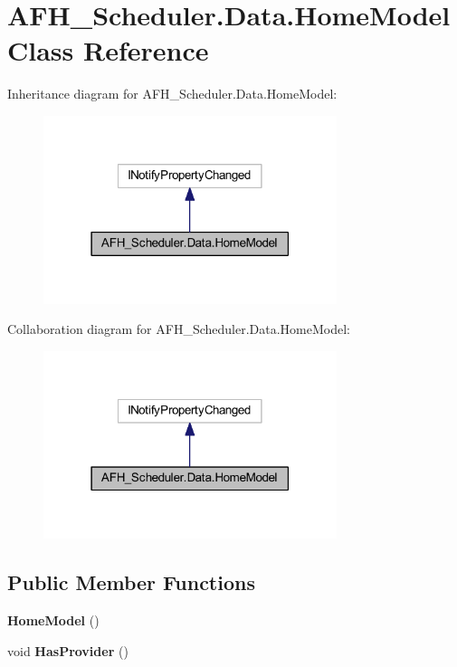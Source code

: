 \section{A\+F\+H\+\_\+\+Scheduler.\+Data.\+Home\+Model Class Reference}
\label{class_a_f_h___scheduler_1_1_data_1_1_home_model}


Inheritance diagram for A\+F\+H\+\_\+\+Scheduler.\+Data.\+Home\+Model\+:
\nopagebreak
\begin{figure}[H]
\begin{center}
\leavevmode
\includegraphics[width=243pt]{class_a_f_h___scheduler_1_1_data_1_1_home_model__inherit__graph}
\end{center}
\end{figure}


Collaboration diagram for A\+F\+H\+\_\+\+Scheduler.\+Data.\+Home\+Model\+:
\nopagebreak
\begin{figure}[H]
\begin{center}
\leavevmode
\includegraphics[width=243pt]{class_a_f_h___scheduler_1_1_data_1_1_home_model__coll__graph}
\end{center}
\end{figure}
\subsection*{Public Member Functions}
\begin{DoxyCompactItemize}
\item 
\textbf{ Home\+Model} ()
\item 
void \textbf{ Has\+Provider} ()
\end{DoxyCompactItemize}
